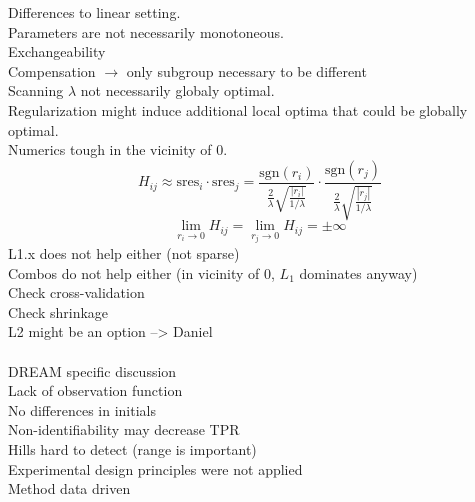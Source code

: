 \documentclass{bioinfo}
\begin{document}
Differences to linear setting.\\
Parameters are not necessarily monotoneous.\\
Exchangeability\\
Compensation $\rightarrow$ only subgroup necessary to be different\\
Scanning $\lambda$ not necessarily globaly optimal.\\
Regularization might induce additional local optima that could be globally optimal.\\
Numerics tough in the vicinity of 0.\\
\begin{equation}
	H_{ij} \approx \text{sres}_i \cdot \text{sres}_j = \frac{\text{sgn}(r_i)}{\frac{2}{\lambda}\sqrt{\frac{|r_i|}{1/\lambda}}} \cdot \frac{\text{sgn}(r_j)}{\frac{2}{\lambda}\sqrt{\frac{|r_j|}{1/\lambda}}}
\end{equation}
\begin{equation}
	\lim_{r_i \rightarrow 0} H_{ij} = \lim_{r_j \rightarrow 0} H_{ij} = \pm \infty
\end{equation}
L1.x does not help either (not sparse)\\
Combos do not help either (in vicinity of 0, $L_1$ dominates anyway)\\
Check cross-validation\\
Check shrinkage\\
L2 might be an option --> Daniel\\ \\
DREAM specific discussion\\
Lack of observation function\\
No differences in initials\\
Non-identifiability may decrease TPR\\
Hills hard to detect (range is important)\\
Experimental design principles were not applied\\
Method data driven

%
%
%
%
\end{document}
